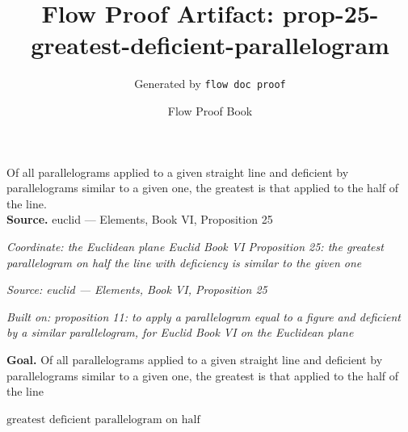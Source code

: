 \documentclass[11pt]{article}
\title{Flow Proof Artifact: prop-25-greatest-deficient-parallelogram}
\author{Generated by \texttt{flow doc proof}}
\date{Flow Proof Book}
\theoremstyle{definition}
\begin{document}
\maketitle
Of all parallelograms applied to a given straight line and deficient by parallelograms similar to a given one, the greatest is that applied to the half of the line.\\[0.5em]
\textbf{Source.} euclid — Elements, Book VI, Proposition 25\\[0.5em]
\bigskip
{}\par
\smallskip\noindent\textit{Coordinate: the Euclidean plane \cdot Euclid Book VI \cdot Proposition 25: the greatest parallelogram on half the line with deficiency is similar to the given one}\par
\smallskip\noindent\textit{Source: euclid — Elements, Book VI, Proposition 25}\par
\smallskip\noindent\textit{Built on: proposition 11: to apply a parallelogram equal to a figure and deficient by a similar parallelogram, for Euclid Book VI on the Euclidean plane}\par
\medskip
\noindent\textbf{Goal.} Of all parallelograms applied to a given straight line and deficient by parallelograms similar to a given one, the greatest is that applied to the half of the line\par
\noindent$\displaystyle \text{greatest deficient parallelogram on half}$\par
\medskip
\noindent
\end{document}
